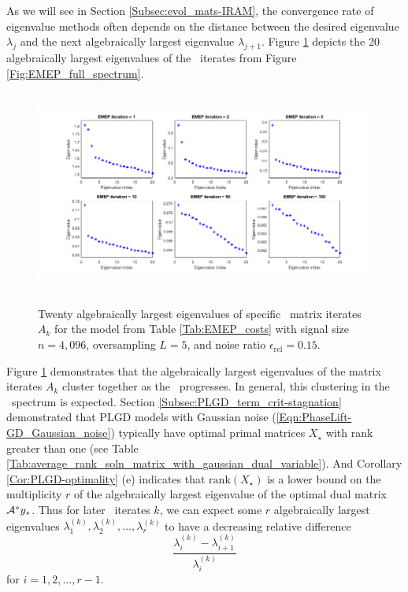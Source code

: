 As we will see in Section \ref{Subsec:evol_mats-IRAM}, the convergence rate of eigenvalue methods often depends on the distance between the desired eigenvalue $\lambda_j$ and the next algebraically largest eigenvalue $\lambda_{j+1}$.  Figure \ref{Fig:EMEP_largest_eigvals} depicts the 20 algebraically largest eigenvalues of the \emep \ iterates from Figure \ref{Fig:EMEP_full_spectrum}.


\begin{figure}[H]
\centering
\hbox{\hspace{-1.9cm} \includegraphics[scale=0.6]{EMEP_largest_eigvals} }\vspace{-0.4cm}
	\caption{Twenty algebraically largest eigenvalues of specific \emep \ matrix iterates $A_k$ for the model from Table \ref{Tab:EMEP_costs} with signal size $n = 4,096$, oversampling $L = 5$, and noise ratio $\epsilon_\text{rel} = 0.15$.}
\label{Fig:EMEP_largest_eigvals}
\end{figure}

Figure \ref{Fig:EMEP_largest_eigvals} demonstrates that the algebraically largest eigenvalues of the matrix iterates $A_k$ cluster together as the \emep \ progresses.  
In general, this clustering in the \emep \ spectrum is expected.  
Section \ref{Subsec:PLGD_term_crit-stagnation} demonstrated that PLGD models with Gaussian noise (\ref{Eqn:PhaseLift-GD_Gaussian_noise}) typically have optimal primal matrices $X_\star$ with rank greater than one (see Table \ref{Tab:average_rank_soln_matrix_with_gaussian_dual_variable}).
And Corollary \ref{Cor:PLGD-optimality} (e) indicates that $\text{rank}(X_\star)$ is a lower bound on the multiplicity $r$ of the algebraically largest eigenvalue of the optimal dual matrix ${\mathcal A}^*y_\star$.
Thus for later \emep \ iterates $k$, we can expect some $r$ algebraically largest eigenvalues $\lambda_1^{(k)}, \lambda_2^{(k)}, \ldots, \lambda_r^{(k)}$ to have a decreasing relative difference
\[
\frac{\lambda_i^{(k)} - \lambda_{i+1}^{(k)}}
	{\lambda_i^{(k)}}
\]
for $i = 1, 2, \ldots, r-1$.



